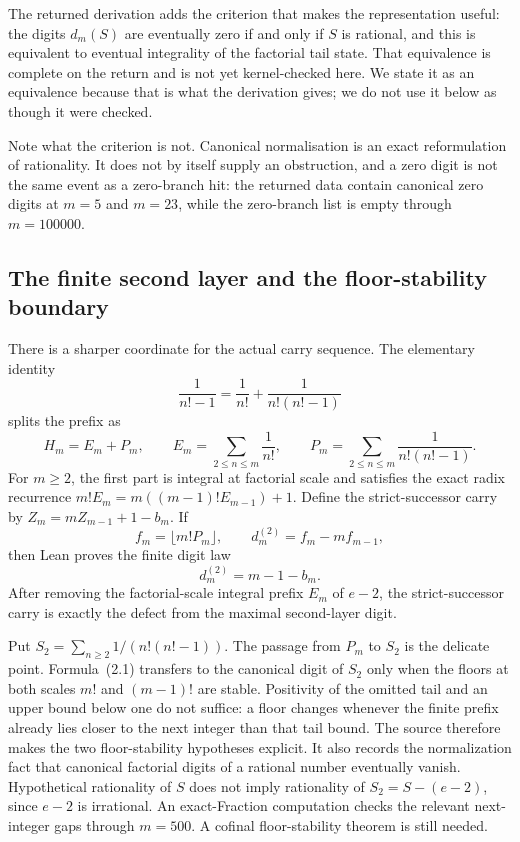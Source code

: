 \documentclass[11pt]{article}
\newcommand{\Ser}{S}
\begin{document}
The returned derivation adds the criterion that makes the representation
useful: the digits $d_m(\Ser)$ are eventually zero if and only if $\Ser$ is
rational, and this is equivalent to eventual integrality of the factorial tail
state.  That equivalence is complete on the return and is not yet kernel-checked
here.  We state it as an equivalence because that is what the derivation gives;
we do not use it below as though it were checked.

Note what the criterion is not.  Canonical normalisation is an exact
reformulation of rationality.  It does not by itself supply an obstruction, and
a zero digit is not the same event as a zero-branch hit: the returned data
contain canonical zero digits at $m=5$ and $m=23$, while the zero-branch list
is empty through $m=100000$.

\subsection{The finite second layer and the floor-stability boundary}

There is a sharper coordinate for the actual carry sequence.  The elementary
identity
\[
 \frac1{n!-1}=\frac1{n!}+\frac1{n!(n!-1)}
\]
splits the prefix as
\[
 H_m=E_m+P_m,
 \qquad
 E_m=\sum_{2\le n\le m}\frac1{n!},
 \qquad
 P_m=\sum_{2\le n\le m}\frac1{n!(n!-1)}.
\]
For $m\ge2$, the first part is integral at factorial scale and satisfies the
exact radix recurrence $m!E_m=m((m-1)!E_{m-1})+1$.  Define the
strict-successor carry by $Z_m=mZ_{m-1}+1-b_m$.  If
\[
 f_m=\lfloor m!P_m\rfloor,
 \qquad d^{(2)}_m=f_m-mf_{m-1},
\]
then Lean proves the finite digit law
\[
 d^{(2)}_m=m-1-b_m.                                      \tag{2.1}
\]
After removing the factorial-scale integral prefix $E_m$ of $e-2$, the
strict-successor carry is exactly the defect from the maximal second-layer
digit.

Put $S_2=\sum_{n\ge2}1/(n!(n!-1))$.  The passage from $P_m$ to $S_2$ is the
delicate point.  Formula~(2.1) transfers to the canonical digit of $S_2$ only
when the floors at both scales $m!$ and $(m-1)!$ are stable.  Positivity of the
omitted tail and an upper bound below one do not suffice: a floor changes
whenever the finite prefix already lies closer to the next integer than that
tail bound.  The source therefore makes the two floor-stability hypotheses
explicit.  It also records the normalization fact that canonical factorial
digits of a rational number eventually vanish.  Hypothetical rationality of
$S$ does not imply rationality of $S_2=S-(e-2)$, since $e-2$ is irrational.
An exact-Fraction computation checks the relevant next-integer gaps through
$m=500$.  A cofinal floor-stability theorem is still needed.
\end{document}

